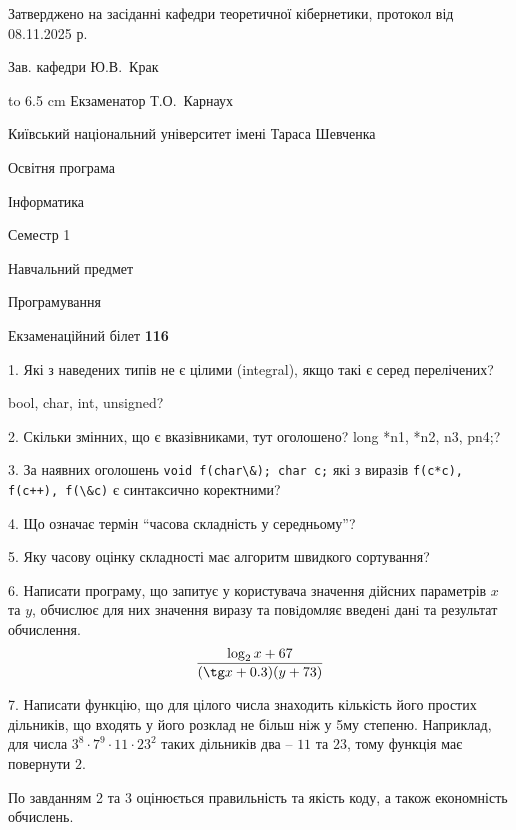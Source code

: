 \documentclass[12pt, ukrainian]{article}
\def\code#1{\Verb!#1!}
\begin{document}
{\smallskip\smallskip \begin {scriptsize} Затверджено на засіданні кафедри теоретичної кібернетики, протокол   від   08.11.2025 р.\par\smallskip\smallskip\smallskip\smallskip
{\parbox {6.5 cm} {Зав. кафедри \dotfill Ю.В.~Крак}}\hspace {0.7cm} {\hbox to 6.5 cm { Екзаменатор \dotfill Т.О.~Карнаух}} \end{scriptsize}}
\vspace{0.9cm}
{{\begin {scriptsize}\par
{ \center  Київський національний університет імені Тараса Шевченка \par}
{\parbox {5 cm}{Освітня програма \hfill}{\parbox {7 cm}{Інформатика\hfill}}\parbox {6 cm}{\hfill Семестр 1}}\par
{\parbox {5 cm} {Навчальний предмет \hfill}\parbox {7 cm}{Програмування \hfill}\parbox {6cm}{\hfill}\par}\vspace{-15pt} \end{scriptsize}}{\center Екзаменаційний білет \No \textbf { 116 }\par}}
{%
1. Які з наведених типів не є цілими (integral), якщо такі є серед перелічених?

bool, char, int, unsigned?
\par
\vspace{2mm}
2. Скільки змінних, що є вказівниками, тут оголошено?
long *n1, *n2, n3, pn4;?
\par
\vspace{2mm}
3. За наявних оголошень \code{void f(char\&); char c;} які з виразів \code{f(c*c), f(c++), f(\&c)} є синтаксично коректними?
\par
\vspace{2mm}
4. Що означає термін ``часова складність у середньому''?
\par
\vspace{2mm}
5. Яку часову оцінку складності має алгоритм швидкого сортування?
\par
\vspace{2mm}
6. Написати програму, що запитує у користувача значення дійсних параметрів $x$ та $y$, обчислює для них значення виразу та повiдомляє введенi данi та результат обчислення.
$$\frac{\log_{2} x + 67}{(\tg x + 0.3) (y + 73)}$$ 

\par
7. Написати функцію, що для цілого числа знаходить кількість його простих дільників, що входять у його розклад не більш ніж у 5му степеню. Наприклад, для числа $3^8{\cdot}7^9{\cdot}11{\cdot}23^{2}$ таких дільників два – $11$ та $23$, тому функція має повернути $2$.

По завданням 2 та 3 оцінюється правильність та якість коду, а також економність обчислень.

}
\end{document}
